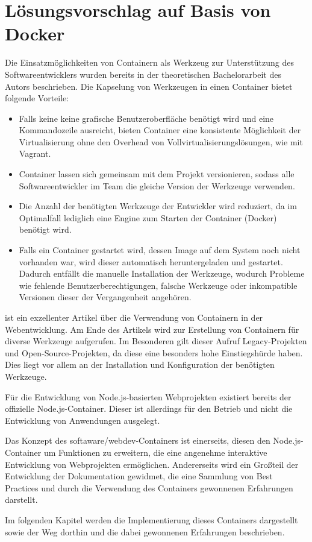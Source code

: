 \chapter{Lösungsvorschlag auf Basis von Docker}
\label{cha:concept}
Die Einsatzmöglichkeiten von Containern als Werkzeug zur Unterstützung des Softwareentwicklers wurden bereits in der theoretischen Bachelorarbeit des Autors beschrieben.
Die Kapselung von Werkzeugen in einen Container bietet folgende Vorteile:

\begin{itemize}
    \item Falls keine keine grafische Benutzeroberfläche benötigt wird und eine Kommandozeile ausreicht, bieten Container eine konsistente Möglichkeit der Virtualisierung ohne den Overhead von Vollvirtualisierungslösungen, wie \zB mit Vagrant.
    \item Container lassen sich gemeinsam mit dem Projekt versionieren, sodass alle Softwareentwickler im Team die gleiche Version der Werkzeuge verwenden.
    \item Die Anzahl der benötigten Werkzeuge der Entwickler wird reduziert, da im Optimalfall lediglich eine Engine zum Starten der Container (\zB Docker) benötigt wird.
    \item Falls ein Container gestartet wird, dessen Image auf dem System noch nicht vorhanden war, wird dieser automatisch heruntergeladen und gestartet.
        Dadurch entfällt die manuelle Installation der Werkzeuge, wodurch Probleme wie fehlende Benutzerberechtigungen, falsche Werkzeuge oder inkompatible Versionen dieser der Vergangenheit angehören.
\end{itemize}
\autocite{Demmel.webdev-environment:online} ist ein exzellenter Artikel über die Verwendung von Containern in der Web\-ent\-wick\-lung.
Am Ende des Artikels wird zur Erstellung von Containern für diverse Werkzeuge aufgerufen.
Im Besonderen gilt dieser Aufruf Legacy-Projekten und Open-Source-Projekten, da diese eine besonders hohe Einstiegshürde haben.
Dies liegt vor allem an der Installation und Konfiguration der benötigten Werkzeuge.


Für die Entwicklung von Node.js-basierten Webprojekten existiert bereits der offizielle Node.js-Container.
Dieser ist allerdings für den Betrieb und nicht die Entwicklung von Anwendungen ausgelegt.

Das Konzept des softaware/webdev-Containers ist einerseits, diesen den Node.js-Container um Funktionen zu erweitern, die eine angenehme interaktive Entwicklung von Webprojekten ermöglichen.
Andererseits wird ein Großteil der Entwicklung der Dokumentation gewidmet, die eine Sammlung von Best Practices und durch die Verwendung des Containers gewonnenen Erfahrungen darstellt.

Im folgenden Kapitel werden die Implementierung dieses Containers dargestellt sowie der Weg dorthin und die dabei gewonnenen Erfahrungen beschrieben.
